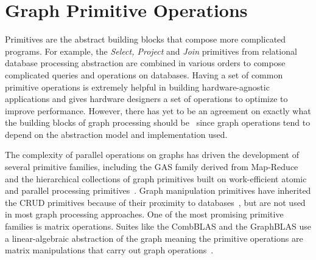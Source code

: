 \section{Graph Primitive Operations}
\label{section:25-graph-primitives}

Primitives are the abstract building blocks that compose more complicated programs. 
For example, the \textit{Select, Project} and \textit{Join} primitives from relational database processing abstraction are combined in various orders to compose complicated queries and operations on databases. 
Having a set of common primitive operations is extremely helpful in building hardware-agnostic applications and gives hardware designers a set of operations to optimize to improve performance. 
However, there has yet to be an agreement on exactly what the building blocks of graph processing should be~\cite{Satish2014} since graph operations tend to depend on the abstraction model and implementation used.

The complexity of parallel operations on graphs has driven the development of several primitive families, including the \ac{GAS} family derived from Map-Reduce~\cite{Malewicz2010} and the hierarchical collections of graph primitives built on work-efficient atomic and parallel processing primitives~\cite{Shun2013, Shun2015, Dhulipala2017, Dhulipala2021}.
Graph manipulation primitives have inherited the \ac{CRUD} primitives because of their proximity to databases~\cite{Vukotic2015}, but are not used in most graph processing approaches. 
One of the most promising primitive families is matrix operations. 
Suites like the \ac{CombBLAS} and the \ac{GraphBLAS} use a linear-algebraic abstraction of the graph meaning the primitive operations are matrix manipulations that carry out graph operations~\cite{Buluc2011, Azad2021, Mattson2013, Kepner2015, Kepner2016}.


